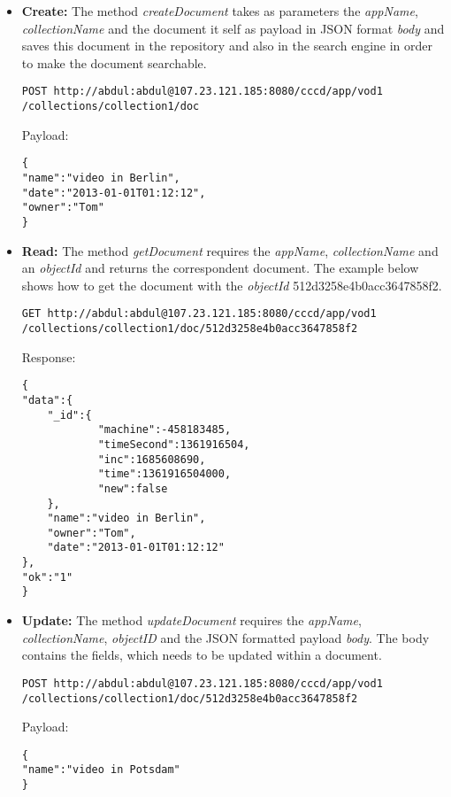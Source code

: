 \begin{itemize}
\item \textbf{Create:} The method \textit{createDocument} takes as parameters  the \textit{appName}, \textit{collectionName} and  the document it self as payload in JSON format \textit{body} and saves this document in the repository and also in the search engine in order to make the document searchable.  

\begin{code}
\begin{verbatim}
POST http://abdul:abdul@107.23.121.185:8080/cccd/app/vod1
/collections/collection1/doc
\end{verbatim}
Payload:
\begin{verbatim}
{
"name":"video in Berlin",
"date":"2013-01-01T01:12:12",
"owner":"Tom"
}
\end{verbatim}
\end{code}


\item \textbf{Read:} The method \textit{getDocument} requires the \textit{appName}, \textit{collectionName} and an \textit{objectId} and returns the correspondent document. The example below shows how to get the document with the \textit{objectId} 512d3258e4b0acc3647858f2.

\begin{code}
\begin{verbatim}
GET http://abdul:abdul@107.23.121.185:8080/cccd/app/vod1
/collections/collection1/doc/512d3258e4b0acc3647858f2
\end{verbatim}
Response:
\begin{verbatim}
{
"data":{
	"_id":{
			"machine":-458183485,
			"timeSecond":1361916504,
			"inc":1685608690,
			"time":1361916504000,
			"new":false
	},
	"name":"video in Berlin",
	"owner":"Tom",
	"date":"2013-01-01T01:12:12"
},
"ok":"1"
}
\end{verbatim}
\end{code}

\item \textbf{Update:} The method \textit{updateDocument} requires the \textit{appName}, \textit{collectionName}, \textit{objectID} and the JSON formatted payload \textit{body}. The body contains  the fields, which needs to be updated within a document.

\begin{code}
\begin{verbatim}
POST http://abdul:abdul@107.23.121.185:8080/cccd/app/vod1
/collections/collection1/doc/512d3258e4b0acc3647858f2
\end{verbatim}
Payload:
\begin{verbatim}
{
"name":"video in Potsdam"
}
\end{verbatim}
\end{code}


\end{itemize}
